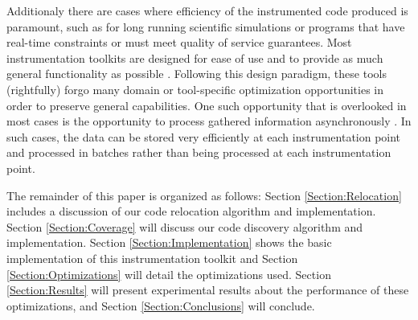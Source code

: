 Additionaly there are cases where efficiency of the instrumented code produced is paramount, such as for long running scientific simulations or programs that have
real-time constraints or must meet quality of service guarantees. Most instrumentation toolkits are designed for ease
of use and to provide as much general functionality as possible \cite{nethercote2007valgrind}. Following this design paradigm, these tools (rightfully) forgo
many domain or tool-specific optimization opportunities in order to preserve general capabilities. One such opportunity that
is overlooked in most cases is the opportunity to process gathered information asynchronously \cite{gao2005aliter}. In such
cases, the data can be stored very efficiently at each instrumentation point and processed in batches rather than being processed
at each instrumentation point. 

The remainder of this paper is organized as follows: Section \ref{Section:Relocation} includes a discussion
of our code relocation algorithm and implementation. Section \ref{Section:Coverage} will discuss our code discovery
algorithm and implementation.
Section \ref{Section:Implementation} shows the basic implementation of
this instrumentation toolkit and Section \ref{Section:Optimizations} will detail the 
optimizations used. Section \ref{Section:Results} will present experimental results about the
performance of these optimizations, and Section \ref{Section:Conclusions} will conclude. 
